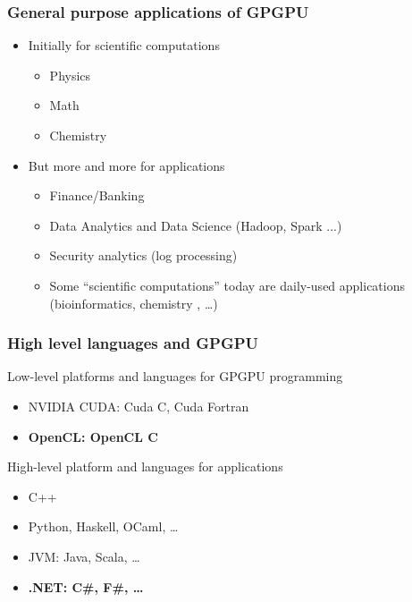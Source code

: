\documentclass[xcolor=table]{beamer}
\begin{document}
\begin{frame}[fragile]
  \transwipe[direction=90]
  \frametitle{General purpose applications of GPGPU}
  \begin{itemize}
    \item Initially for scientific computations
    \begin{itemize}
      \item Physics
      \item Math
      \item Chemistry
    \end{itemize}
    \item But more and more for applications
      \begin{itemize} 
        \item Finance/Banking
        \item Data Analytics and Data Science (Hadoop, Spark ...)
        \item Security analytics (log processing)
        \item Some ``scientific computations'' today are daily-used applications (bioinformatics, chemistry , \dots)
      \end{itemize}
  \end{itemize}
\end{frame}

\begin{frame}
  \transwipe[direction=90]
  \frametitle{High level languages and GPGPU}
\begin{minipage}[m]{0.45\linewidth}
Low-level platforms and languages for GPGPU programming
\begin{itemize}
\item NVIDIA CUDA: Cuda C, Cuda Fortran
\item \textbf{OpenCL: OpenCL C}
\end{itemize}
\end{minipage}\hfill
\begin{minipage}[m]{0.45\linewidth}
High-level platform and languages for applications
\begin{itemize}
      \item C++
      \item Python, Haskell, OCaml, \dots
      \item JVM: Java, Scala, \dots 
      \item \textbf{.NET: C\#, F\#, \dots}
\end{itemize}
\end{minipage}

\pause
\vspace{1cm}
\end{frame}
\end{document}
